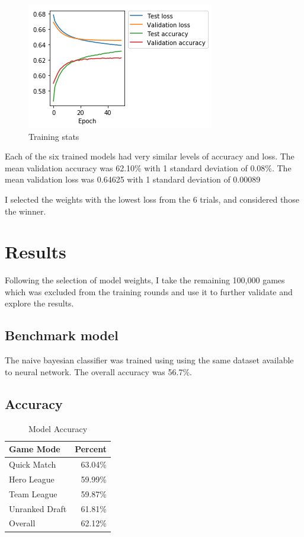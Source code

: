 \documentclass[twoside,twocolumn]{article}
\begin{document}
\begin{figure}[h]
\caption{Training stats}
\label{figure:training}
\includegraphics[width=\linewidth]{training}
\centering
\end{figure}

Each of the six trained models had very similar levels of accuracy and loss.  The mean validation accuracy was 62.10\% with 1 standard deviation of 0.08\%.  The mean validation loss was  0.64625 with 1 standard deviation of 0.00089

I selected the weights with the lowest loss from the 6 trials, and considered those the winner.

\section {Results}
Following the selection of model weights, I take the remaining 100,000 games which was excluded from the training rounds and use it to further validate and explore the results.  

\subsection {Benchmark model}

The naive bayesian classifier was trained using  using the same dataset available to neural network.  The overall accuracy was 56.7\%.

\subsection {Accuracy}

\begin{table}[h]
\caption{Model Accuracy}
\label{table:acc}
\centering
\begin{tabular}{lr}
\toprule
Game Mode & Percent \\
\midrule
Quick Match & 63.04\% \\
Hero League & 59.99\% \\
Team League & 59.87\% \\
Unranked Draft & 61.81\% \\
\midrule
Overall & 62.12\% \\
\bottomrule
\end{tabular}
\end{table}
\end{document}
